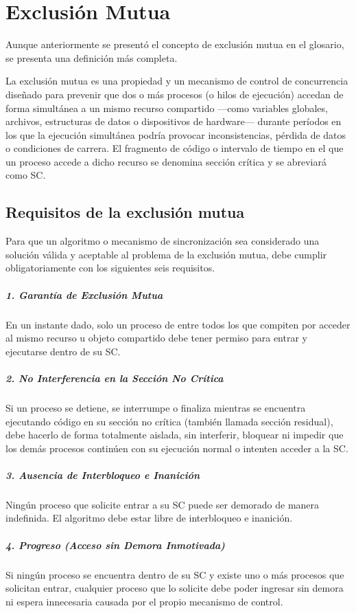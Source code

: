 \section{Exclusión Mutua}

Aunque anteriormente se presentó el concepto de exclusión mutua en el glosario, se presenta una definición más completa.

La exclusión mutua es una propiedad y un mecanismo de control de concurrencia diseñado para prevenir que dos o más procesos (o hilos de ejecución) accedan de forma simultánea a un mismo recurso compartido ---como variables globales, archivos, estructuras de datos o dispositivos de hardware--- durante períodos en los que la ejecución simultánea podría provocar inconsistencias, pérdida de datos o condiciones de carrera. El fragmento de código o intervalo de tiempo en el que un proceso accede a dicho recurso se denomina sección crítica y se abreviará como SC.

\subsection{Requisitos de la exclusión mutua}

Para que un algoritmo o mecanismo de sincronización sea considerado una solución válida y aceptable al problema de la exclusión mutua, debe cumplir obligatoriamente con los siguientes seis requisitos.

\subparagraph{1. Garantía de Exclusión Mutua}
En un instante dado, solo un proceso de entre todos los que compiten por acceder al mismo recurso u objeto compartido debe tener permiso para entrar y ejecutarse dentro de su SC. 

\subparagraph{2. No Interferencia en la Sección No Crítica}
Si un proceso se detiene, se interrumpe o finaliza mientras se encuentra ejecutando código en su sección no crítica (también llamada sección residual), debe hacerlo de forma totalmente aislada, sin interferir, bloquear ni impedir que los demás procesos continúen con su ejecución normal o intenten acceder a la SC.

\subparagraph{3. Ausencia de Interbloqueo e Inanición}
Ningún proceso que solicite entrar a su SC puede ser demorado de manera indefinida. El algoritmo debe estar libre de interbloqueo e inanición.

\subparagraph{4. Progreso (Acceso sin Demora Inmotivada)}
Si ningún proceso se encuentra dentro de su SC y existe uno o más procesos que solicitan entrar, cualquier proceso que lo solicite debe poder ingresar sin demora ni espera innecesaria causada por el propio mecanismo de control.

